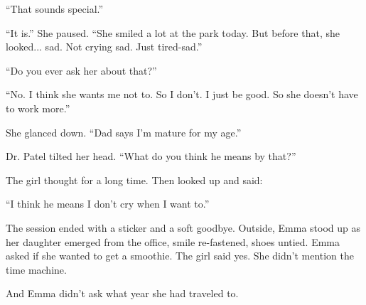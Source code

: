 ``That sounds special.''

``It is.'' She paused. ``She smiled a lot at the park today. But before that, she looked... sad. 
Not crying sad. Just tired-sad.''

``Do you ever ask her about that?''

``No. I think she wants me not to. So I don’t. I just be good. So she doesn’t have to work more.''  

She glanced down. ``Dad says I’m mature for my age.''

Dr. Patel tilted her head. ``What do you think he means by that?''

The girl thought for a long time. Then looked up and said:

``I think he means I don’t cry when I want to.''



The session ended with a sticker and a soft goodbye. Outside, Emma stood up as her daughter 
emerged from the office, smile re-fastened, shoes untied. Emma asked if she wanted to get a 
smoothie. The girl said yes. She didn’t mention the time machine.

And Emma didn’t ask what year she had traveled to.

\medskip

